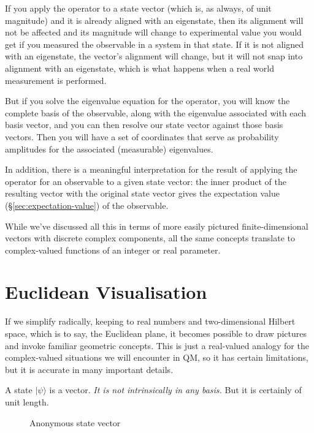 If you apply the operator to a state vector (which is, as always, of unit magnitude) and it is already aligned with an eigenstate, then its alignment will not be affected and its magnitude will change to experimental value you would get if you measured the observable in a system in that state. If it is not aligned with an eigenstate, the vector's alignment will change, but it will not snap into alignment with an eigenstate, which is what happens when a real world measurement is performed.

But if you solve the eigenvalue equation for the operator, you will know the complete basis of the observable, along with the eigenvalue associated with each basis vector, and you can then resolve our state vector against those basis vectors. Then you will have a set of coordinates that serve as probability amplitudes for the associated (measurable) eigenvalues.

In addition, there is a meaningful interpretation for the result of applying the operator for an observable to a given state vector: the inner product of the resulting vector with the original state vector gives the expectation value (§\ref{sec:expectation-value}) of the observable.

While we've discussed all this in terms of more easily pictured finite-dimensional vectors with discrete complex components, all the same concepts translate to complex-valued functions of an integer or real parameter.

\section{Euclidean Visualisation}

If we simplify radically, keeping to real numbers and two-dimensional Hilbert space, which is to say, the Euclidean plane, it becomes possible to draw pictures and invoke familiar geometric concepts. This is just a real-valued analogy for the complex-valued situations we will encounter in QM, so it has certain limitations, but it is accurate in many important details.

A state $|\psi\rangle$ is a vector. \textit{It is not intrinsically in any basis.} But it is certainly of unit length.

\begin{figure}[h]
  \centering
  \centering
  \caption{Anonymous state vector} \label{fig:state-vector}
\end{figure}

